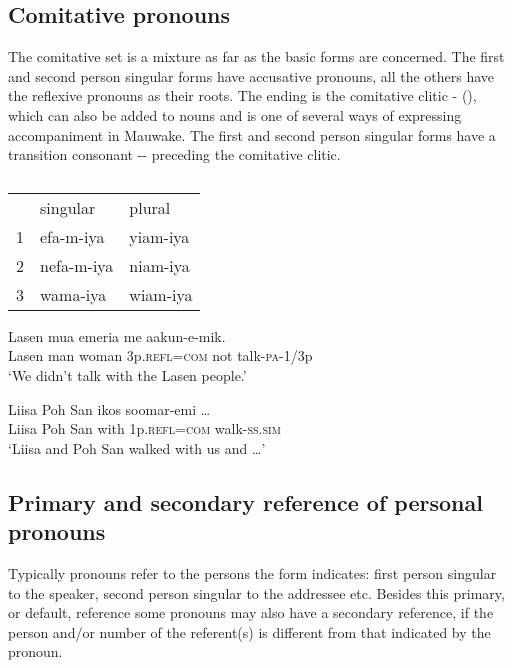 \subsection{Comitative pronouns}
{}
The comitative set is a mixture as far as the basic forms are concerned. The first and second person singular forms have accusative pronouns, all the others have the reflexive pronouns as their roots. The ending is the comitative clitic - (), which can also be added to nouns and is one of several ways of expressing accompaniment in Mauwake. The first and second person singular forms have a transition consonant -- preceding the comitative clitic.

\begin{table}
\caption{}
\label{} 
\begin{tabular}{lll}
 &singular &plural\\
1 &efa-m-iya &yiam-iya\\
2 &nefa-m-iya &niam-iya\\
3 &wama-iya &wiam-iya\\
\end{tabular}
\end{table}


\ea%
\label{ex:x619}
\gll Lasen mua emeria  me aakun-e-mik. \\
Lasen man woman 3p.\textsc{refl}=\textsc{com} not talk-\textsc{pa}-1/3p\\
\glt`We didn't talk with the Lasen people.'
\z

\ea%
\label{ex:x620}
\gll Liisa Poh San ikos  soomar-emi {\dots} \\
Liisa Poh San with 1p.\textsc{refl}=\textsc{com} walk-\textsc{ss}.\textsc{sim}\\
\glt`Liisa and Poh San walked with us and {\dots}'
\z

\subsection{Primary and secondary reference of personal pronouns}
{}
Typically pronouns refer to the persons the form indicates: first person singular to the speaker, second person singular to the addressee etc. Besides this primary, or default, reference some pronouns may also have a secondary reference, if the person and/or number of the referent(s) is different from that indicated by the pronoun.

